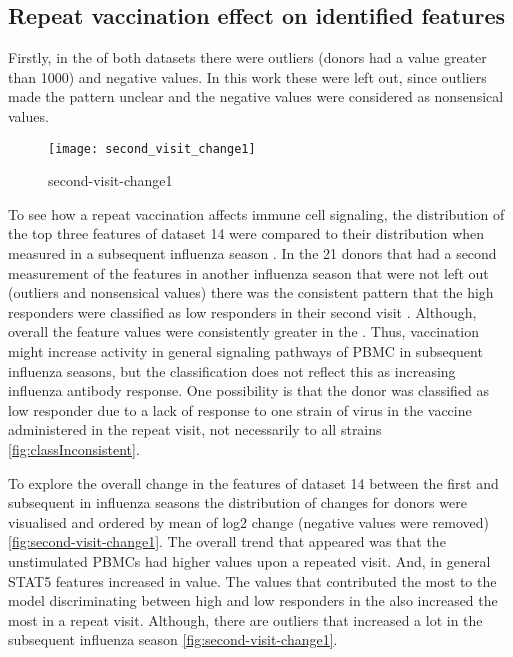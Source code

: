 \subsection{Repeat vaccination effect on identified features}

Firstly, in the \secondvis of both datasets there were outliers (donors had a value greater than 1000) and negative values. In this work these were left out, since outliers made the pattern unclear and the negative values were considered as nonsensical values.

\begin{figure}[htpb]
    \centering
    \texttt{[image: second\_visit\_change1]}
    \caption{second-visit-change1}
    \label{fig:second-visit-change1}
\end{figure}

To see how a repeat vaccination affects immune cell signaling, the distribution of the top three features of dataset 14 were compared to their distribution when measured in a subsequent influenza season .
In the 21 donors that had a second measurement of the features in another influenza season that were not left out (outliers and nonsensical values) there was the consistent pattern that the high responders were classified as low responders in their second visit .
Although, overall the feature values were consistently greater in the \secondvis {}.
Thus, vaccination might increase activity in general signaling pathways of PBMC in subsequent influenza seasons, but the classification does not reflect this as increasing influenza antibody response.
One possibility is that the donor was classified as low responder due to a lack of response to one strain of virus in the vaccine administered in the repeat visit, not necessarily to all strains \autoref{fig:classInconsistent}.

To explore the overall change in the features of dataset 14 between the first and subsequent in influenza seasons the distribution of changes for donors were visualised and ordered by mean of log2 change (negative values were removed) \autoref{fig:second-visit-change1}.
The overall trend that appeared was that the unstimulated PBMCs had higher values upon a repeated visit.
And, in general STAT5 features increased in value. The values that contributed the most to the model discriminating between high and low responders in the \firstvis also increased the most in a repeat visit.
Although, there are outliers that increased a lot in the subsequent influenza season \autoref{fig:second-visit-change1}.

